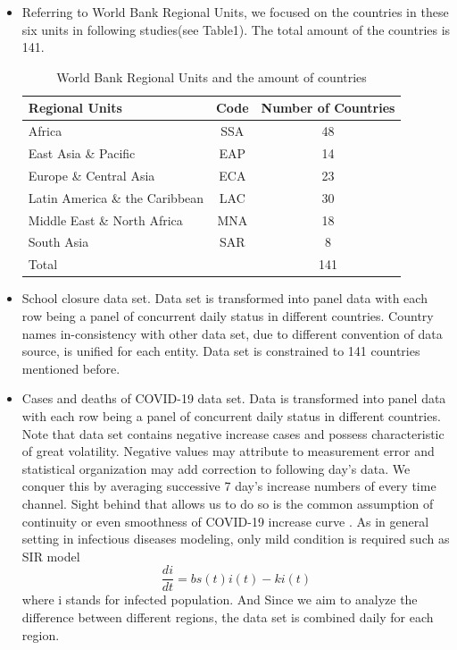 \documentclass{article}
\begin{document}
\begin{itemize}

\item Referring to World Bank Regional Units, we focused on the countries in these six units in following studies(see Table1). The total amount of the countries is 141.


\begin{table}[]
\setlength{\belowcaptionskip}{0.2cm}
\label{Tab:1}
\caption{World Bank Regional Units and the amount of countries}
\centering
\begin{tabular}{lcc}
\hline
Regional Units                 & Code & Number of Countries    \\ \hline
Africa                         & SSA & 48    \\ 
East Asia \& Pacific           & EAP & 14    \\
Europe \& Central Asia         & ECA & 23    \\
Latin America \& the Caribbean & LAC & 30    \\
Middle East \& North Africa    & MNA & 18    \\
South Asia                     & SAR & 8    \\ 
Total                          &     & 141  \\ \hline
\end{tabular}
\end{table}

\item School closure data set. Data set is transformed into panel data with each row being a panel of concurrent daily status in different countries. Country names in-consistency with other data set, due to different convention of data source, is unified for each entity. Data set is constrained to 141 countries mentioned before.

\item Cases and deaths of COVID-19 data set. Data is transformed into panel data with each row being a panel of concurrent daily status in different countries. Note that data set contains negative increase cases and possess characteristic of great volatility. Negative values may attribute to measurement error and statistical organization may add correction to following day's data. We conquer this by averaging successive 7 day's increase numbers of every time channel. Sight behind that allows us to do so is the common assumption of continuity or even smoothness of COVID-19 increase curve \cite{SHUR21,Alvarez21}. As in general setting in infectious diseases modeling, only mild condition is required such as SIR model \cite{kermack}
$$
\frac{d i}{d t}=b s(t) i(t)-k i(t)
$$
where i stands for infected population.
And Since we aim to analyze the difference between different regions, the data set is combined daily for each region.



\end{itemize}
\end{document}
